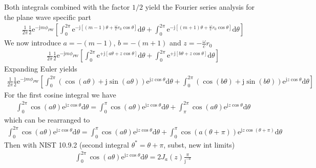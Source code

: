 \documentclass[a4paper,BCOR=15mm,10pt,twoside]{scrartcl}
\newcommand\e{\mathrm{e}}  %
\newcommand\im{\mathrm{j}}  %
\newcommand\fsd{\mathrm{d}}  %
\begin{document}
Both integrals combined with the factor $1/2$ yield the Fourier series analysis for the plane wave specific part
\begin{align}
\frac{1}{2\pi}
\frac{1}{2}
\e^{- \im m \phi_{PW}}
[
\int_0^{2\pi} \mathrm{e}^{-\mathrm{j}[(m-1)\theta+\frac{\omega}{c} r_0 \cos\theta]} \fsd \theta+
\int_0^{2\pi} \mathrm{e}^{-\mathrm{j}[(m+1)\theta+\frac{\omega}{c} r_0 \cos\theta]} \fsd \theta
]
\end{align}
We now introduce 
$a=-(m-1)$, $b=-(m+1)$ and $z=-\frac{\omega}{c} r_0 $ 
\begin{align}
\frac{1}{2\pi}
\frac{1}{2}
\e^{- \im m \phi_{PW}}
[
\int_0^{2\pi} \mathrm{e}^{+\mathrm{j}[a \theta + z \cos\theta]} \fsd \theta +
\int_0^{2\pi} \mathrm{e}^{+\mathrm{j}[b \theta + z \cos\theta]} \fsd \theta
]
\end{align}
Expanding Euler yields
\begin{align}
\frac{1}{2\pi}
\frac{1}{2}
\e^{- \im m \phi_{PW}}
[
\int_0^{2\pi} (\cos(a\theta)+\im \sin(a\theta)) \mathrm{e}^{\mathrm{j} z \cos\theta} \fsd \theta+
\int_0^{2\pi} (\cos(b\theta)+\im \sin(b\theta)) \mathrm{e}^{\mathrm{j} z \cos\theta} \fsd \theta
]
\end{align}
For the first cosine integral we have
\begin{align}
\int_0^{2\pi} \cos(a\theta) \mathrm{e}^{\mathrm{j} z \cos\theta} \fsd \theta =
\int_0^{\pi} \cos(a\theta) \mathrm{e}^{\mathrm{j} z \cos\theta} \fsd \theta  + 
\int_\pi^{2\pi} \cos(a\theta) \mathrm{e}^{\mathrm{j} z \cos\theta} \fsd \theta 
\end{align}
which can be rearranged to
\begin{align}
\int_0^{2\pi} \cos(a\theta) \mathrm{e}^{\mathrm{j} z \cos\theta} \fsd \theta =
\int_0^{\pi} \cos(a\theta) \mathrm{e}^{\mathrm{j} z \cos\theta} \fsd \theta  + 
\int_0^{\pi} \cos(a(\theta+\pi)) \mathrm{e}^{\mathrm{j} z \cos(\theta+\pi)} \fsd \theta 
\end{align}
Then with NIST 10.9.2 (second integral $\theta^* = \theta + \pi$, subst, new int limits)
\begin{align}
\int_0^{2\pi} \cos(a\theta) \mathrm{e}^{\mathrm{j} z \cos\theta} \fsd \theta =
2 J_{a}(z) \frac{\pi}{\im^{-a}}
\end{align}
\end{document}
